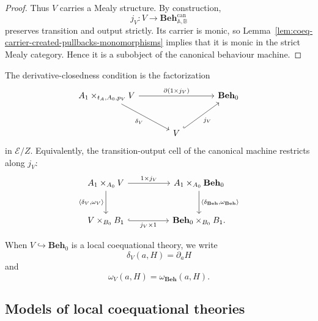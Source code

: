 \begin{proof}
    Thus \(V\) carries a Mealy structure. By construction,
    \[
        j_V:
        V\to
        \mathbf{Beh}^{\mathrm{can}}_{\mathbb A,\mathbb B}
    \]
    preserves transition and output strictly. Its carrier is monic, so
    Lemma~\ref{lem:coeq-carrier-created-pullbacks-monomorphisms} implies that
    it is monic in the strict Mealy category. Hence it is a subobject of the
    canonical behaviour machine.
\end{proof}

The derivative-closedness condition is the factorization
\[
\begin{tikzcd}[column sep=large, row sep=large]
    A_1\times_{t_A,A_0,p_V}V
        \arrow[rr, "{\partial(1\times j_V)}"]
        \arrow[dr, "\delta_V"']
    &&
    \mathbf{Beh}_0
    \\
    &
    V
        \arrow[ur, hook, "j_V"']
    &
\end{tikzcd}
\]
in \(\mathcal E/Z\). Equivalently, the transition-output cell of the canonical
machine restricts along \(j_V\):
\[
\begin{tikzcd}[column sep=huge, row sep=large]
    A_1\times_{A_0}V
        \arrow[r, "{1\times j_V}"]
        \arrow[d, "{\langle\delta_V,\omega_V\rangle}"']
    &
    A_1\times_{A_0}\mathbf{Beh}_0
        \arrow[d, "{\langle\delta_{\mathbf{Beh}},\omega_{\mathbf{Beh}}\rangle}"]
    \\
    V\times_{B_0}B_1
        \arrow[r, hook, "{j_V\times 1}"']
    &
    \mathbf{Beh}_0\times_{B_0}B_1 .
\end{tikzcd}
\]

When \(V\hookrightarrow\mathbf{Beh}_0\) is a local coequational theory, we
write
\[
    \delta_V(a,H)=\partial_aH
\]
and
\[
    \omega_V(a,H)=\omega_{\mathbf{Beh}}(a,H).
\]

\subsection{Models of local coequational theories}
\label{subsec:models-local-coequational-theories}

